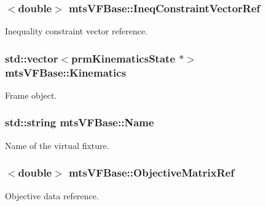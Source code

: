 \subsubsection[{Ineq\+Constraint\+Vector\+Ref}]{$<$double$>$ mts\+V\+F\+Base\+::\+Ineq\+Constraint\+Vector\+Ref}\label{classmts_v_f_base_a630a27c6fd52487f0981d6c6fa273823}


Inequality constraint vector reference. 

\hypertarget{classmts_v_f_base_ad68e05d7529b31405ab7efc74a2dbeaa}{}
\subsubsection[{Kinematics}]{\setlength{\rightskip}{0pt plus 5cm}std\+::vector$<$prm\+Kinematics\+State $\ast$$>$ mts\+V\+F\+Base\+::\+Kinematics}\label{classmts_v_f_base_ad68e05d7529b31405ab7efc74a2dbeaa}


Frame object. 

\hypertarget{classmts_v_f_base_ab8c00c15a86f7df135f985e10983065e}{}
\subsubsection[{Name}]{\setlength{\rightskip}{0pt plus 5cm}std\+::string mts\+V\+F\+Base\+::\+Name}\label{classmts_v_f_base_ab8c00c15a86f7df135f985e10983065e}


Name of the virtual fixture. 

\hypertarget{classmts_v_f_base_ac4da2ed51e5b51a104ad0949457aaadb}{}
\subsubsection[{Objective\+Matrix\+Ref}]{$<$double$>$ mts\+V\+F\+Base\+::\+Objective\+Matrix\+Ref}\label{classmts_v_f_base_ac4da2ed51e5b51a104ad0949457aaadb}


Objective data reference. 

\hypertarget{classmts_v_f_base_a97679c797cd0099833eab17d255be220}{}

